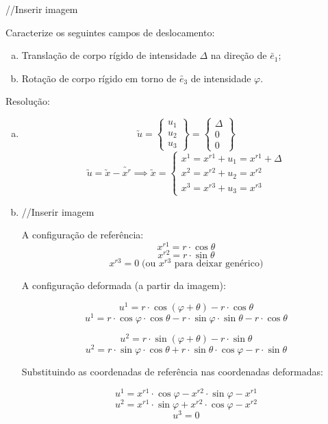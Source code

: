 \documentclass[12pt, a4paper]{article}
\begin{document}
	//Inserir imagem
	
	Caracterize os seguintes campos de deslocamento:
	
	\begin{enumerate}[a)]
		\item Translação de corpo rígido de intensidade $\Delta$ na direção de $\utilde{e_1}$;
		\item Rotação de corpo rígido em torno de $\utilde{e_3}$ de intensidade $\varphi$.
	\end{enumerate}
	
	Resolução:
	
	\begin{enumerate}[a)]
		\item
			\[
			\utilde{u}=
				\begin{Bmatrix}
				u_1 \\ u_2 \\ u_3
				\end{Bmatrix}
				=
				\begin{Bmatrix}
					\Delta \\ 0 \\ 0
				\end{Bmatrix}
			\]
			\[\utilde{u}=\utilde{x}-\utilde{x^r}
			\implies
			\utilde{x}=
			\begin{cases} x^1=x^{r1}+u_1=x^{r1}+\Delta \\ x^2=x^{r2}+u_2=x^{r2} \\ x^3=x^{r3}+u_3=x^{r3}
			\end{cases}
			\]
		\item
			//Inserir imagem
			
			A configuração de referência:
			\[x^{r1}=r\cdot \cos\theta\]
			\[x^{r2}=r\cdot\sin\theta\]
			\[x^{r3}=0\;\text{(ou }x^{r3}\text{ para deixar genérico})\]
			
			A configuração deformada (a partir da imagem):
			
			\[u^1=r\cdot\cos(\varphi+\theta)-r\cdot\cos\theta\]
			\[u^1=r\cdot\cos\varphi\cdot\cos\theta-r\cdot\sin\varphi\cdot\sin\theta-r\cdot\cos\theta\]
			
			\[u^2=r\cdot\sin(\varphi+\theta)-r\cdot\sin\theta\]
			\[u^2=r\cdot\sin\varphi\cdot\cos\theta+r\cdot\sin\theta\cdot\cos\varphi-r\cdot\sin\theta\]
			
			Substituindo as coordenadas de referência nas coordenadas deformadas:
			
			\[u^1=x^{r1}\cdot\cos\varphi-x^{r2}\cdot\sin\varphi-x^{r1}\]
			\[u^2=x^{r1}\cdot\sin\varphi+x^{r2}\cdot\cos\varphi-x^{r2}\]
			\[u^3=0\]
			

\end{enumerate}
\end{document}
